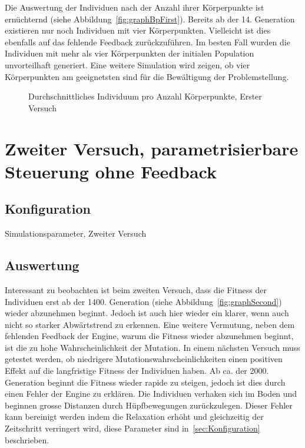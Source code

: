      Die Auswertung der Individuen nach der Anzahl ihrer Körperpunkte ist ernüchternd (siehe Abbildung~\vref{fig:graphBpFirst}).
      Bereits ab der 14. Generation existieren nur noch Individuen mit vier Körperpunkten.
      Vielleicht ist dies ebenfalls auf das fehlende Feedback zurückzuführen.
      Im besten Fall wurden die Individuen mit mehr als vier Körperpunkten der initialen Population unvorteilhaft generiert.
      Eine weitere Simulation wird zeigen,
      ob vier Körperpunkten am geeignetsten sind für die Bewältigung der Problemstellung.

      \begin{figure}
        \centering
        
        \caption{Durchschnittliches Individuum pro Anzahl Körperpunkte, Erster Versuch\label{fig:graphBpFirst}}
      \end{figure}

  \section{Zweiter Versuch, parametrisierbare Steuerung ohne Feedback}

    \subsection{Konfiguration}

      \begin{table}[H]
        \centering
        
        \caption{Simulationsparameter, Zweiter Versuch}
      \end{table}

    \subsection{Auswertung}

      Interessant zu beobachten ist beim zweiten Versuch,
      dass die Fitness der Individuen erst ab der 1400\@. Generation (siehe Abbildung~\vref{fig:graphSecond})
      wieder abzunehmen beginnt.
      Jedoch ist auch hier wieder ein klarer, wenn auch nicht so starker Abwärtstrend zu erkennen.
      Eine weitere Vermutung, neben dem fehlenden Feedback der Engine, warum die Fitness wieder abzunehmen beginnt,
      ist die zu hohe Wahrscheinlichkeit der Mutation.
      In einem nächsten Versuch muss getestet werden,
      ob niedrigere Mutationswahrscheinlichkeiten einen positiven Effekt auf die langfristige Fitness der Individuen haben.
      Ab ca\@. der 2000\@. Generation beginnt die Fitness wieder rapide zu steigen,
      jedoch ist dies durch einen Fehler der Engine zu erklären.
      Die Individuen verhaken sich im Boden und beginnen grosse Distanzen durch Hüpfbewegungen zurückzulegen.
      Dieser Fehler kann bereinigt werden indem die Relaxation erhöht und gleichzeitig der Zeitschritt verringert wird,
      diese Parameter sind in~\vref{sec:Konfiguration} beschrieben.

